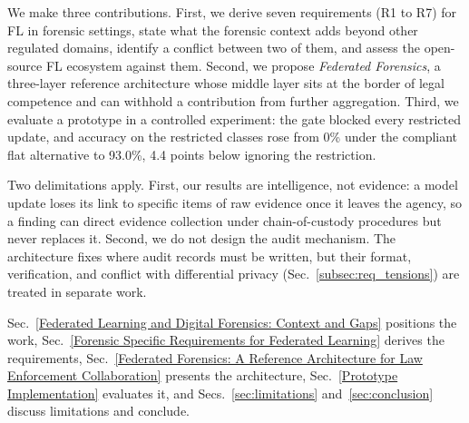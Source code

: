 We make three contributions. First, we derive seven requirements (R1 to R7) for FL in forensic settings, state what the forensic context adds beyond other regulated domains, identify a conflict between two of them, and assess the open-source FL ecosystem against them. Second, we propose \emph{Federated Forensics}, a three-layer reference architecture whose middle layer sits at the border of legal competence and can withhold a contribution from further aggregation. Third, we evaluate a prototype in a controlled experiment: the gate blocked every restricted update, and accuracy on the restricted classes rose from 0\% under the compliant flat alternative to 93.0\%, 4.4 points below ignoring the restriction.

Two delimitations apply. First, our results are intelligence, not evidence: a model update loses its link to specific items of raw evidence once it leaves the agency, so a finding can direct evidence collection under chain-of-custody procedures but never replaces it. Second, we do not design the audit mechanism. The architecture fixes where audit records must be written, but their format, verification, and conflict with differential privacy (Sec.~\ref{subsec:req_tensions}) are treated in separate work.

Sec.~\ref{Federated Learning and Digital Forensics: Context and Gaps} positions the work, Sec.~\ref{Forensic Specific Requirements for Federated Learning} derives the requirements, Sec.~\ref{Federated Forensics: A Reference Architecture for Law Enforcement Collaboration} presents the architecture, Sec.~\ref{Prototype Implementation} evaluates it, and Secs.~\ref{sec:limitations} and~\ref{sec:conclusion} discuss limitations and conclude.
